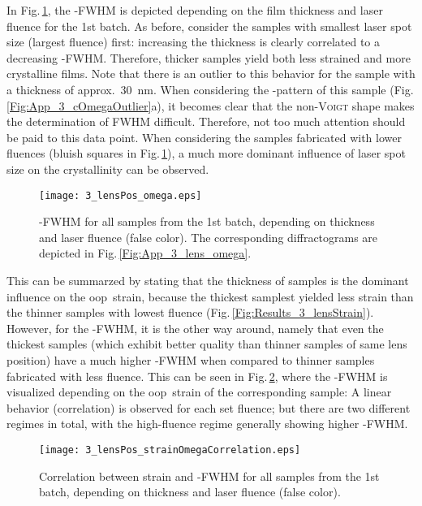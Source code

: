 In Fig.\,\ref{Fig:Results_3_lensOmega}, the \textomega-FWHM is depicted depending on the film thickness and laser fluence for the 1st batch.
As before, consider the samples with smallest laser spot size (largest fluence) first:
increasing the thickness is clearly correlated to a decreasing \textomega-FWHM.
Therefore, thicker samples yield both less strained and more crystalline films.
Note that there is an outlier to this behavior for the sample with a thickness of approx.\ \qty{30}{\nm}.
When considering the \textomega-pattern of this sample (Fig.\,\ref{Fig:App_3_cOmegaOutlier}a), it becomes clear that the non-\textsc{Voigt} shape makes the determination of \gls{FWHM} difficult.
Therefore, not too much attention should be paid to this data point.
When considering the samples fabricated with lower fluences (bluish squares in Fig.\,\ref{Fig:Results_3_lensOmega}), a much more dominant influence of laser spot size on the crystallinity can be observed.
\begin{figure}
    \centering
    \texttt{[image: 3\_lensPos\_omega.eps]}
    \caption{
        \textomega-FWHM for all samples from the 1st batch, depending on thickness and laser fluence (false color).
        The corresponding diffractograms are depicted in Fig.\,\ref{Fig:App_3_lens_omega}.
    }
    \label{Fig:Results_3_lensOmega}
\end{figure}
This can be summarzed by stating that the thickness of samples is the dominant influence on the \gls{oop}\ strain, because the thickest samplest yielded less strain than the thinner samples with lowest fluence (Fig.\,\ref{Fig:Results_3_lensStrain}).
However, for the \textomega-FWHM, it is the other way around, namely that even the thickest samples (which exhibit better quality than thinner samples of same lens position) have a much higher \textomega-FWHM when compared to thinner samples fabricated with less fluence.
This can be seen in Fig.\,\ref{Fig:Results_3_lensCorrelation}, where the \textomega-FWHM is visualized depending on the \gls{oop}\ strain of the corresponding sample:
A linear behavior (correlation) is observed for each set fluence; but there are two different regimes in total, with the high-fluence regime generally showing higher \textomega-FWHM.
\begin{figure}
    \centering
    \texttt{[image: 3\_lensPos\_strainOmegaCorrelation.eps]}
    \caption{
        Correlation between strain and \textomega-FWHM for all samples from the 1st batch, depending on thickness and laser fluence (false color).
    }
    \label{Fig:Results_3_lensCorrelation}
\end{figure}